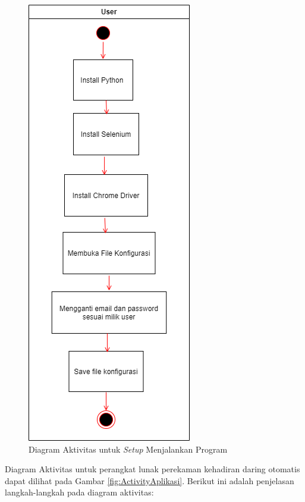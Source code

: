 \begin{figure}[H]
	\centering
	\includegraphics[scale=0.4]{Gambar/ActivitySetup.png}
	\caption{Diagram Aktivitas untuk \textit{Setup} Menjalankan Program} 
	\label{fig:ActivitySetup}
\end{figure}
Diagram Aktivitas untuk perangkat lunak perekaman kehadiran daring otomatis dapat dilihat pada Gambar \ref{fig:ActivityAplikasi}. Berikut ini adalah penjelasan langkah-langkah pada diagram aktivitas:
